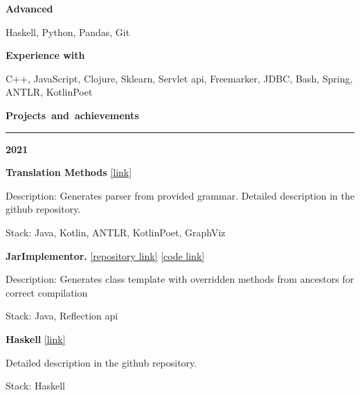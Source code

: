 \documentclass[11pt,a4paper]{report}
\begin{document}
\textbf{Advanced}

\vspace{5px}
\hspace{10px}
Haskell, Python, Pandas, Git
\vspace{5px}

\textbf{Experience with}

\vspace{5px}
\hspace{10px}
C++, JavaScript, Clojure, Sklearn, Servlet api, Freemarker, JDBC, Bash, Spring, ANTLR, KotlinPoet
\vspace{10px}


\par\hbox{\Large\textbf{Projects and achievements}}\kern5pt\hrule

\vspace{10px}
\textbf{\Large{2021}}

\hspace{10px} \textbf{Translation Methods} \href{https://github.com/Kvel4/Translation-Methods}{[link]}

\hspace{20px} Description: Generates parser from provided grammar. Detailed description in the github repository.

\hspace{20px} Stack: Java, Kotlin, ANTLR, KotlinPoet, GraphViz

\vspace{10px}


\hspace{10px} \textbf{JarImplementor.} \href{https://github.com/Kvel4/java-advanced}{[repository link]} \href{https://github.com/Kvel4/java-advanced/tree/master/java-solutions/info/kgeorgiy/ja/monakhov/implementor}{[code link]}

\hspace{20px} Description: Generates class template with overridden methods from ancestors for correct compilation

\hspace{20px} Stack: Java, Reflection api

\vspace{10px}

\hspace{10px} \textbf{Haskell} \href{https://github.com/Kvel4/haskell}{[link]}

\hspace{20px} Detailed description in the github repository.

\hspace{20px} Stack: Haskell
\end{document}
